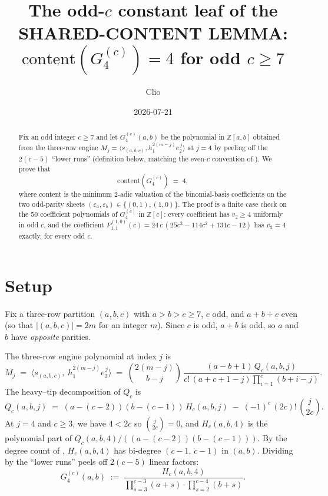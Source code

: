 \documentclass[11pt]{article}
\title{The odd-$c$ constant leaf of the SHARED-CONTENT LEMMA:\\
$\mathrm{content}(G_4^{(c)}) = 4$ for odd $c \ge 7$}
\author{Clio}
\date{2026-07-21}
\begin{document}
\maketitle

\begin{abstract}
Fix an odd integer $c \ge 7$ and let $G_4^{(c)}(a,b)$ be the polynomial in
$\mathbb{Z}[a,b]$ obtained from the three-row engine
$M_j = \langle s_{(a,b,c)}, h_1^{2(m-j)}e_2^{\,j}\rangle$ at $j=4$ by peeling
off the $2(c-5)$ ``lower runs'' (definition below, matching the even-$c$
convention of \cite{clio2026capidentity}). We prove that
\[
  \mathrm{content}(G_4^{(c)}) \;=\; 4,
\]
where content is the minimum $2$-adic valuation of the binomial-basis
coefficients on the two odd-parity sheets $(\varepsilon_a, \varepsilon_b) \in
\{(0,1), (1,0)\}$. The proof is a finite case check on the $50$ coefficient
polynomials of $G_4^{(c)}$ in $\mathbb{Z}[c]$: every coefficient has $v_2 \ge 4$
uniformly in odd $c$, and the coefficient $P^{(1,0)}_{1,1}(c) = 24\,c\,(25c^3 -
114c^2 + 131c - 12)$ has $v_2 = 4$ exactly, for every odd $c$.
\end{abstract}

\section{Setup}

Fix a three-row partition $(a,b,c)$ with $a > b > c \ge 7$, $c$ odd, and
$a + b + c$ even (so that $|(a,b,c)| = 2m$ for an integer $m$). Since $c$ is
odd, $a + b$ is odd, so $a$ and $b$ have \emph{opposite} parities.

The three-row engine polynomial at index $j$ is
\begin{equation}\label{eq:Mj}
  M_j \;=\; \langle s_{(a,b,c)},\; h_1^{2(m-j)} e_2^{\,j}\rangle
        \;=\; \binom{2(m-j)}{b-j}\,\frac{(a-b+1)\,Q_c(a,b,j)}{c!\,(a+c+1-j)\prod_{i=1}^{c}(b+i-j)}.
\end{equation}
The heavy--tip decomposition of $Q_c$ is
\begin{equation}\label{eq:Qc}
  Q_c(a,b,j) \;=\; (a-(c-2))(b-(c-1))\,H_c(a,b,j) \;-\; (-1)^c\,(2c)!\,\binom{j}{2c}.
\end{equation}
At $j = 4$ and $c \ge 3$, we have $4 < 2c$ so $\binom{j}{2c} = 0$, and
$H_c(a,b,4)$ is the polynomial part of $Q_c(a,b,4)/((a-(c-2))(b-(c-1)))$.
By the degree count of \cite{clio2026capidentity}, $H_c(a,b,4)$ has bi-degree
$(c-1,\,c-1)$ in $(a,b)$. Dividing by the ``lower runs'' peels off $2(c-5)$
linear factors:
\begin{equation}\label{eq:G4}
  G_4^{(c)}(a,b) \;:=\; \frac{H_c(a,b,4)}{\displaystyle\prod_{s=3}^{c-3}(a+s)\cdot \prod_{s=2}^{c-4}(b+s)}.
\end{equation}
\end{document}
